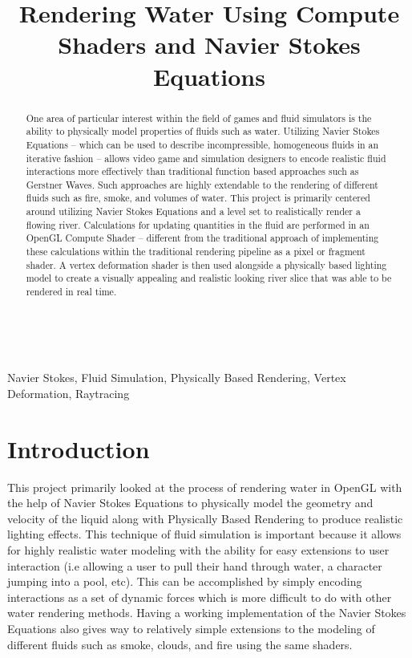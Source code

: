 \documentclass[conference]{IEEEtran}
\begin{document}
\title{Rendering Water Using Compute Shaders and Navier Stokes Equations}

\author{
} \\

\maketitle

\begin{abstract}
	One area of particular interest within the field of games and fluid simulators is the ability to physically model properties of fluids such as water.
	Utilizing Navier Stokes Equations -- which can be used to describe incompressible, homogeneous fluids in an iterative fashion -- allows video game and simulation designers to encode realistic fluid interactions more effectively than traditional function based approaches such as Gerstner Waves. Such approaches are highly extendable to the rendering of different fluids such as fire, smoke, and volumes of water.
	This project is primarily centered around utilizing Navier Stokes Equations and a level set to realistically render a flowing river. Calculations for updating quantities in the fluid are performed in an OpenGL Compute Shader -- different from the traditional approach of implementing these calculations within the traditional rendering pipeline as a pixel or fragment shader. A vertex deformation shader is then used alongside a physically based lighting model to create a visually appealing and realistic looking river slice that was able to be rendered in real time.
\end{abstract}

\begin{IEEEkeywords}
Navier Stokes, Fluid Simulation, Physically Based Rendering, Vertex Deformation, Raytracing
\end{IEEEkeywords}

\section{Introduction}

This project primarily looked at the process of rendering water in OpenGL with the help of Navier Stokes Equations to physically model the geometry and velocity of the liquid along with Physically Based Rendering to produce realistic lighting effects. This technique of fluid simulation is important because it allows for highly realistic water modeling with the ability for easy extensions to user interaction (i.e allowing a user to pull their hand through water, a character jumping into a pool, etc). This can be accomplished by simply encoding interactions as a set of dynamic forces which is more difficult to do with other water rendering methods. Having a working implementation of the Navier Stokes Equations also gives way to relatively simple extensions to the modeling of different fluids such as smoke, clouds, and fire using the same shaders.
\end{document}
